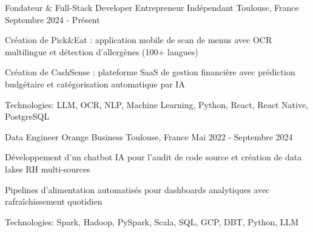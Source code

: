 


\begin{cventries}


\cventry
{Fondateur \& Full-Stack Developer} %
{Entrepreneur Indépendant} %
{Toulouse, France} %
{Septembre 2024 - Présent} %
{ %
\begin{cvitems}
\item {Création de Pick\&Eat : application mobile de scan de menus avec OCR multilingue et détection d'allergènes (100+ langues)}
\item {Création de CashSense : plateforme SaaS de gestion financière avec prédiction budgétaire et catégorisation automatique par IA}
\item {Technologies: LLM, OCR, NLP, Machine Learning, Python, React, React Native, PostgreSQL}
\end{cvitems}
}
\vspace{1.5em}


\cventry
{Data Engineer} %
{Orange Business} %
{Toulouse, France} %
{Mai 2022 - Septembre 2024} %
{ %
\begin{cvitems}
\item {Développement d'un chatbot IA pour l'audit de code source et création de data lakes RH multi-sources}
\item {Pipelines d'alimentation automatisés pour dashboards analytiques avec rafraîchissement quotidien}
\item {Technologies: Spark, Hadoop, PySpark, Scala, SQL, GCP, DBT, Python, LLM}
\end{cvitems}
}
\vspace{1.5em}



\end{cventries}
